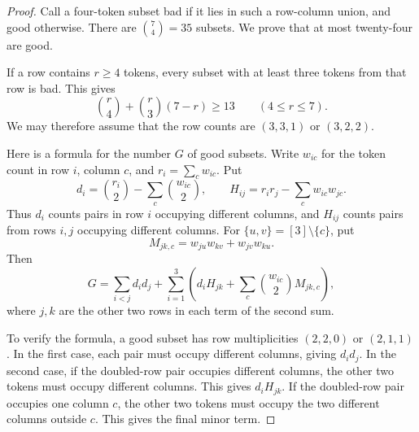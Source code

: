 \begin{proof}
Call a four-token subset bad if it lies in such a row-column union, and good otherwise.
There are $\binom74=35$ subsets.
We prove that at most twenty-four are good.

If a row contains $r\ge4$ tokens, every subset with at least three tokens from that row is bad.
This gives
\[
 \binom r4+\binom r3(7-r)\ge13
 \qquad(4\le r\le7).
\]
We may therefore assume that the row counts are $(3,3,1)$ or $(3,2,2)$.

Here is a formula for the number $G$ of good subsets.
Write $w_{ic}$ for the token count in row $i$, column $c$, and $r_i=\sum_cw_{ic}$.
Put
\[
 d_i=\binom{r_i}{2}-\sum_c\binom{w_{ic}}2,
 \qquad H_{ij}=r_ir_j-\sum_cw_{ic}w_{jc}.
\]
Thus $d_i$ counts pairs in row $i$ occupying different columns, and $H_{ij}$ counts pairs from rows $i,j$ occupying different columns.
For $\{u,v\}=[3]\setminus\{c\}$, put
\[
 M_{jk,c}=w_{ju}w_{kv}+w_{jv}w_{ku}.
\]
Then
\begin{equation}\label{eq:path-seven-grid-good-count}
 G=\sum_{i<j}d_id_j
   +\sum_{i=1}^3
       \left(d_iH_{jk}+\sum_c\binom{w_{ic}}2M_{jk,c}\right),
\end{equation}
where $j,k$ are the other two rows in each term of the second sum.

To verify the formula, a good subset has row multiplicities $(2,2,0)$ or $(2,1,1)$.
In the first case, each pair must occupy different columns, giving $d_id_j$.
In the second case, if the doubled-row pair occupies different columns, the other two tokens must occupy different columns.
This gives $d_iH_{jk}$.
If the doubled-row pair occupies one column $c$, the other two tokens must occupy the two different columns outside $c$.
This gives the final minor term.


\end{proof}
